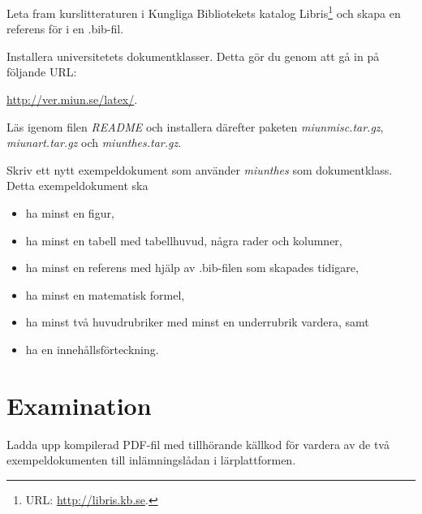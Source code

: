 \documentclass[11pt,a4paper]{miunasgn}
\begin{document}
Leta fram kurslitteraturen i Kungliga Bibliotekets katalog Libris\footnote{%
	URL: \url{http://libris.kb.se}.
} och skapa en referens för \BibTeX i en .bib-fil.

Installera universitetets dokumentklasser.
Detta gör du genom att gå in på följande URL:
\begin{center}
	\url{http://ver.miun.se/latex/}.
\end{center}
Läs igenom filen \emph{README} och installera därefter paketen 
\emph{miunmisc.tar.gz}, \emph{miunart.tar.gz} och \emph{miunthes.tar.gz}.

Skriv ett nytt exempeldokument som använder \emph{miunthes} som dokumentklass.
Detta exempeldokument ska
\begin{itemize}
	\item ha minst en figur,
	\item ha minst en tabell med tabellhuvud, några rader och kolumner,
	\item ha minst en referens med hjälp av .bib-filen som skapades tidigare,
	\item ha minst en matematisk formel,
	\item ha minst två huvudrubriker med minst en underrubrik vardera, samt
	\item ha en innehållsförteckning.
\end{itemize}


\section{Examination}
\label{sec:Examination}
\noindent
Ladda upp kompilerad PDF-fil med tillhörande källkod för vardera av de två 
exempeldokumenten till inlämningslådan i lärplattformen.



\end{document}
